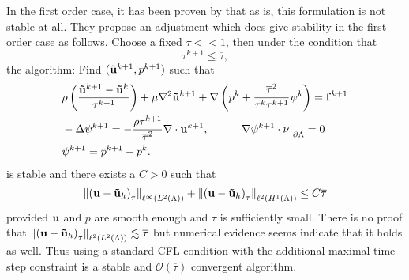 \documentclass[letterpaper]{erdc}
\begin{document}
In the first order case, it has been proven by \cite{bonito2015modified} that as is, this formulation is not stable at all.  They propose an adjustment which does give stability in the first order case as follows.  Choose a fixed $\overline{\tau}<<1$, then under the condition that 
\begin{equation}
  \tau^{k+1} \leq \overline{\tau},
\end{equation}
the algorithm: Find $(\mathbf{\tilde{u}}^{k+1},p^{k+1})$ such that
\begin{align}
  &\rho\left( \frac{\mathbf{\tilde{u}}^{k+1} - \mathbf{\tilde{u}}^{k}}{\tau^{k+1}} \right) + \mu\nabla^2 \mathbf{\tilde{u}}^{k+1} + \nabla\left( p^{k} + \frac{\overline{\tau}^2}{\tau^{k}\tau^{k+1}}\psi^{k}\right) = \mathbf{f}^{k+1}\label{eq:newadaptivevelocitybdf1}\\
  &-\Delta \psi^{k+1} = -\frac{\rho\tau^{k+1}}{\overline{\tau}^2}\nabla\cdot\textbf{u}^{k+1}, \hspace{1cm} \left.\nabla\psi^{k+1}\cdot\nu\right|_{\partial\Lambda} = 0 \label{eq:newadaptivepressurecorrectionbdf1}\\
  & \psi^{k+1} = p^{k+1} - p^{k}.
\end{align}
is stable and there exists a $C>0$ such that
\begin{equation}
\left\| \left( \textbf{u} - \mathbf{\tilde{u}}_h \right)_{\tau} \right\|_{\ell^{\infty}(L^2(\Lambda))} + \left\| \left(\textbf{u} - \mathbf{\tilde{u}}_h\right)_{\tau} \right\|_{\ell^{2}(H^1(\Lambda))} \leq C \overline{\tau}
\end{equation}
provided $\textbf{u}$ and $p$ are smooth enough and $\tau$ is sufficiently small.  There is no proof that $\left\| \left( \textbf{u} - \mathbf{\tilde{u}}_h \right)_{\tau} \right\|_{\ell^{2}(L^2(\Lambda))} \lesssim \overline{\tau}$ but numerical evidence seems indicate that it holds as well.  Thus using a standard CFL condition with the additional maximal time step constraint is a stable and $\mathcal{O}(\overline{\tau})$ convergent algorithm.


%
%
\end{document}
